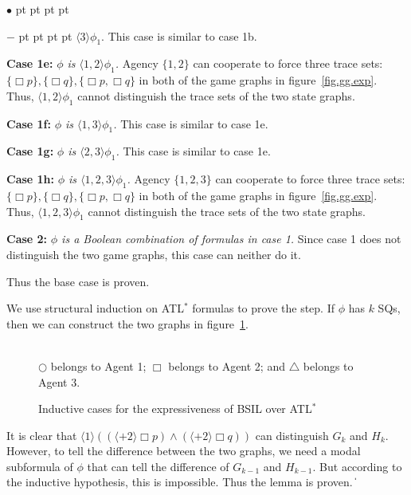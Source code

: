 \documentclass[11pt]{article}
\newcommand{\pfrr}{\Box}
\def\qed{\ifmmode\|\else{\unskip\nobreak\hfil
\penalty50\hskip1em\null\nobreak\hfil$\blacksquare$
\parfillskip=0pt\finalhyphendemerits=0\endgraf}\fi}
\newenvironment{list1}{\begin{list}{$\bullet$}
{\topsep 0 pt \parsep 0 pt \partopsep 0 pt \itemsep 0 pt}}{\end{list}}
\newenvironment{list2}{\begin{list}{$-$}
{\topsep 0 pt \parsep 0 pt \partopsep 0 pt \itemsep 0 pt}}{\end{list}}
\begin{document}
\begin{list1}
\begin{list2}
{        $\langle 3\rangle\phi_1$.}
        This case is similar to case 1b.
    \item {\bf Case 1e:} {\em $\phi$ is
        $\langle 1,2\rangle\phi_1$.}
        Agency $\{1, 2\}$ can cooperate to force three trace sets:
        $\{\pfrr p\}, \{\pfrr q\}, \{\pfrr p,\pfrr q\}$
        in both of the game graphs in figure~\ref{fig.gg.exp}.
        Thus, $\langle 1,2\rangle\phi_1$ cannot distinguish the trace sets of the
        two state graphs.
    \item {\bf Case 1f:} {\em $\phi$ is
        $\langle 1,3\rangle\phi_1$.}
        This case is similar to case 1e.
    \item {\bf Case 1g:} {\em $\phi$ is
        $\langle 2,3\rangle\phi_1$.}
        This case is similar to case 1e.
    \item {\bf Case 1h:} {\em $\phi$ is
        $\langle 1,2,3\rangle\phi_1$.}
        Agency $\{1, 2,3\}$ can cooperate to force three trace sets:
        $\{\pfrr p\}, \{\pfrr q\}, \{\pfrr p,\pfrr q\}$
        in both of the game graphs in figure~\ref{fig.gg.exp}.
        Thus, $\langle 1,2,3\rangle\phi_1$ cannot distinguish the trace sets of the
        two state graphs.
    \end{list2}
\item {\bf Case 2:} {\em $\phi$ is a Boolean combination of
    formulas in case 1.}
    Since case 1 does not distinguish the two game graphs,
    this case can neither do it.
\end{list1}
Thus the base case is proven.

We use structural induction on ATL$^*$ formulas to prove the step.
If $\phi$ has $k$ SQs,
then we can construct the two graphs in figure~\ref{fig.gg.expi}.
\begin{figure}[t]\begin{center}
\\
$\bigcirc$ belongs to Agent  1; $\pfrr$ belongs to Agent 2; and 
$\triangle$ belongs to Agent 3.
\end{center}
\caption{Inductive cases for the expressiveness of BSIL over ATL$^*$}
\label{fig.gg.expi}
\end{figure}
It is clear that
$\langle 1\rangle ((\langle+ 2\rangle \pfrr p)
    \wedge (\langle+ 2\rangle \pfrr q))$ can distinguish
$G_k$ and $H_k$.
However, to tell the difference between the two graphs,
we need a modal subformula of $\phi$ that can tell the difference
of $G_{k-1}$ and $H_{k-1}$.
But according to the inductive hypothesis, this is impossible.
Thus the lemma is proven.  
\qed 
\end{document}
